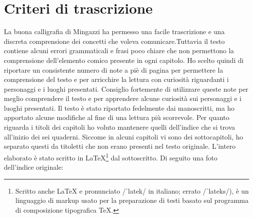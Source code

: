 \thispagestyle{empty}
\chapter*{Criteri di trascrizione}
La buona calligrafia di Mingazzi ha permesso una facile trascrizione e una discreta comprensione dei concetti che voleva comunicare.\:Tuttavia il testo contiene alcuni errori grammaticali e frasi poco chiare che non permettono la comprensione dell'elemento comico presente in ogni capitolo. Ho scelto quindi di riportare un consistente numero di note a piè di pagina per permettere la comprensione del testo e per arricchire la lettura con curiosità riguardanti i personaggi e i luoghi presentati. Consiglio fortemente di utilizzare queste note per meglio comprendere il testo e per apprendere alcune curiosità sui personaggi e i luoghi presentati. Il testo è stato riportato fedelmente dai manoscritti, ma ho apportato alcune modifiche al fine di una lettura più scorrevole. Per quanto riguarda i titoli dei capitoli ho voluto mantenere quelli dell'indice che si trova all'inizio dei sei quaderni. Siccome in alcuni capitoli vi sono dei sottocapitoli, ho separato questi da titoletti che non erano presenti nel testo originale. L'intero elaborato è stato scritto in \LaTeX\footnote{Scritto anche \LaTeX \: e pronunciato /ˈlatek/ in italiano; errato /ˈlateks/), è un linguaggio di markup usato per la preparazione di testi basato sul programma di composizione tipografica \TeX.} \:dal sottoscritto.\newpage
\noindent Di seguito una foto dell'indice originale:\\
